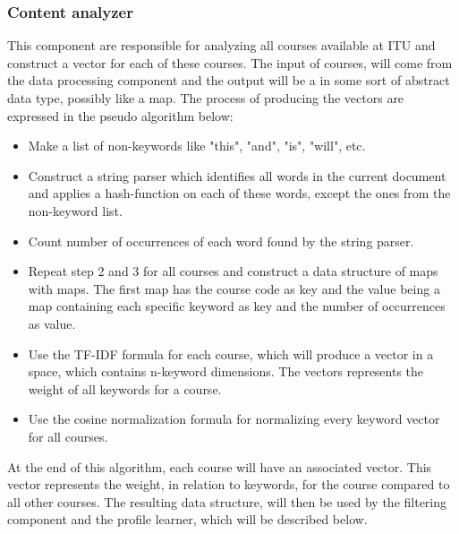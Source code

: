 \subsubsection{Content analyzer}
This component are responsible for analyzing all courses available at ITU and construct a vector for each of these courses. The input of courses, will come from the data processing component and the output will be a in some sort of abstract data type, possibly like a map. The process of producing the vectors are expressed in the pseudo algorithm below:
\begin{itemize}
	\item Make a list of non-keywords like "this", "and", "is", "will", etc.
	\item Construct a string parser which identifies all words in the current document and applies a hash-function on each of these words, except the ones from the non-keyword list.
	\item Count number of occurrences of each word found by the string parser.
	\item Repeat step 2 and 3 for all courses and construct a data structure of maps with maps. The first map has the course code as key and the value being a map containing each specific keyword as key and the number of occurrences as value. 
	\item Use the TF-IDF formula for each course, which will produce a vector in a space, which contains n-keyword dimensions. The vectors represents the weight of all keywords for a course.
	\item Use the cosine normalization formula for normalizing every keyword vector for all courses.
\end{itemize}
At the end of this algorithm, each course will have an associated vector. This vector represents the weight, in relation to keywords, for the course compared to all other courses. The resulting data structure, will then be used by the filtering component and the profile learner, which will be described below.

